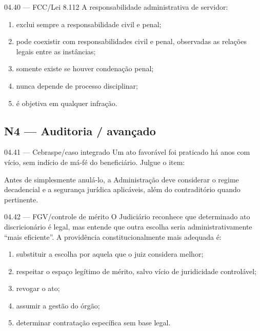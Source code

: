 \begin{questao}{ 04.40 — FCC/Lei 8.112}
A responsabilidade administrativa de servidor:
\begin{enumerate}[label=\Alph*)]
\item exclui sempre a responsabilidade civil e penal;
\item pode coexistir com responsabilidades civil e penal, observadas as relações legais entre as instâncias;
\item somente existe se houver condenação penal;
\item nunca depende de processo disciplinar;
\item é objetiva em qualquer infração.
\end{enumerate}
\end{questao}

\subsection*{N4 — Auditoria / avançado}

\begin{questao}{ 04.41 — Cebraspe/caso integrado}
Um ato favorável foi praticado há anos com vício, sem indício de má-fé do beneficiário. Julgue o item:

Antes de simplesmente anulá-lo, a Administração deve considerar o regime decadencial e a segurança jurídica aplicáveis, além do contraditório quando pertinente.
\end{questao}

\begin{questao}{ 04.42 — FGV/controle de mérito}
O Judiciário reconhece que determinado ato discricionário é legal, mas entende que outra escolha seria administrativamente ``mais eficiente''. A providência constitucionalmente mais adequada é:
\begin{enumerate}[label=\Alph*)]
\item substituir a escolha por aquela que o juiz considera melhor;
\item respeitar o espaço legítimo de mérito, salvo vício de juridicidade controlável;
\item revogar o ato;
\item assumir a gestão do órgão;
\item determinar contratação específica sem base legal.
\end{enumerate}
\end{questao}

